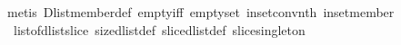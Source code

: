 \begin{isabellebody}
\isamarkupfalse%
\ {\isacharparenleft}metis\ Dlist{\isachardot}member{\isacharunderscore}def\ empty{\isacharunderscore}iff\ empty{\isacharunderscore}set\ in{\isacharunderscore}set{\isacharunderscore}conv{\isacharunderscore}nth\ in{\isacharunderscore}set{\isacharunderscore}member\ \isanewline
\ \ list{\isacharunderscore}of{\isacharunderscore}dlist{\isacharunderscore}slice\ size{\isacharunderscore}dlist{\isacharunderscore}def\ slice{\isacharunderscore}dlist{\isacharunderscore}def\ slice{\isacharunderscore}singleton{\isacharparenright}\isanewline
\isanewline
%
\endisatagproof
{\isafoldproof}%
%
\isadelimproof
%
\endisadelimproof
%
\isadelimtheory
%
\endisadelimtheory
%
\isatagtheory
%
\endisatagtheory
{\isafoldtheory}%
%
\isadelimtheory
%
\endisadelimtheory
%
\end{isabellebody}%
